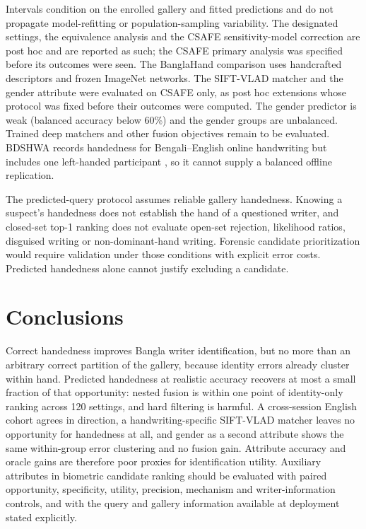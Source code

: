 Intervals condition on the enrolled gallery and fitted predictions and do not propagate model-refitting or population-sampling variability. The designated settings, the equivalence analysis and the CSAFE sensitivity-model correction are post hoc and are reported as such; the CSAFE primary analysis was specified before its outcomes were seen. The BanglaHand comparison uses handcrafted descriptors and frozen ImageNet networks. The SIFT-VLAD matcher and the gender attribute were evaluated on CSAFE only, as post hoc extensions whose protocol was fixed before their outcomes were computed. The gender predictor is weak (balanced accuracy below 60\%) and the gender groups are unbalanced. Trained deep matchers and other fusion objectives remain to be evaluated. BDSHWA records handedness for Bengali--English online handwriting but includes one left-handed participant \cite{bdshwa2026}, so it cannot supply a balanced offline replication.

The predicted-query protocol assumes reliable gallery handedness. Knowing a suspect's handedness does not establish the hand of a questioned writer, and closed-set top-1 ranking does not evaluate open-set rejection, likelihood ratios, disguised writing or non-dominant-hand writing. Forensic candidate prioritization would require validation under those conditions with explicit error costs. Predicted handedness alone cannot justify excluding a candidate.

\section{Conclusions}
\label{sec:conclusions}
Correct handedness improves Bangla writer identification, but no more than an arbitrary correct partition of the gallery, because identity errors already cluster within hand. Predicted handedness at realistic accuracy recovers at most a small fraction of that opportunity: nested fusion is within one point of identity-only ranking across 120 settings, and hard filtering is harmful. A cross-session English cohort agrees in direction, a handwriting-specific SIFT-VLAD matcher leaves no opportunity for handedness at all, and gender as a second attribute shows the same within-group error clustering and no fusion gain. Attribute accuracy and oracle gains are therefore poor proxies for identification utility. Auxiliary attributes in biometric candidate ranking should be evaluated with paired opportunity, specificity, utility, precision, mechanism and writer-information controls, and with the query and gallery information available at deployment stated explicitly.

